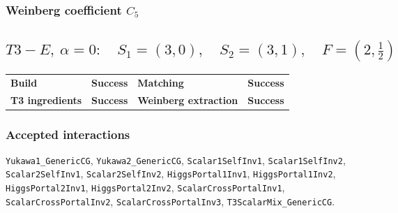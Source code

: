\documentclass[10pt]{article}
\begin{document}
\subsubsection*{Weinberg coefficient $C_5$}
\noindent{}\par
\smallskip
\clearpage
\subsection*{$T3-E,\ \alpha=0:\quad S_1=(3,0),\quad S_2=(3,1),\quad F=(2,\frac{1}{2})$}
\begin{center}
\begin{tabular}{>{\bfseries}l l >{\bfseries}l l}
\toprule
Build & \textbf{Success} & Matching & \textbf{Success} \\
T3 ingredients & \textbf{Success} & Weinberg extraction & \textbf{Success} \\
\bottomrule
\end{tabular}
\end{center}
\subsubsection*{Accepted interactions}
\texttt{Yukawa1\_GenericCG}, \texttt{Yukawa2\_GenericCG}, \texttt{Scalar1SelfInv1}, \texttt{Scalar1SelfInv2}, \texttt{Scalar2SelfInv1}, \texttt{Scalar2SelfInv2}, \texttt{HiggsPortal1Inv1}, \texttt{HiggsPortal1Inv2}, \texttt{HiggsPortal2Inv1}, \texttt{HiggsPortal2Inv2}, \texttt{ScalarCrossPortalInv1}, \texttt{ScalarCrossPortalInv2}, \texttt{ScalarCrossPortalInv3}, \texttt{T3ScalarMix\_GenericCG}.
\end{document}
